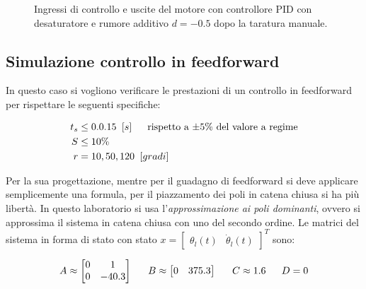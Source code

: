 		\begin{figure}[H]
			\centering
			 
			\caption{Ingressi di controllo e uscite del motore con controllore PID con desaturatore e rumore additivo $d=-0.5$ dopo la taratura manuale.}
			\label{fig:PIDd__0_5}		
		\end{figure}		
		
		
		
	
	
	
	
	
		
	\subsection{Simulazione controllo in feedforward}	
	\label{subsec:feedforwardSim}
	
		In questo caso si vogliono verificare le prestazioni di un controllo in feedforward per rispettare le seguenti specifiche:

		\begin{align*}
			t_s &\le 0.0.15 \singleSpacing [s] \trippleSpacing \textnormal{rispetto a $\pm 5 \%$ del valore a regime} \\
			S &\le 10  \% \\
			r &= 10,50,120 \singleSpacing [gradi] \\
		\end{align*}	
		
		\noindent Per la sua progettazione, mentre per il guadagno di feedforward si deve applicare semplicemente una formula, per il piazzamento dei poli in catena chiusa si ha più libertà. In questo laboratorio si usa l'\textit{approssimazione ai poli dominanti}, ovvero si approssima il sistema in catena chiusa con uno del secondo ordine. Le matrici del sistema in forma di stato con stato $x=\begin{bmatrix}\theta_l(t) & \dot{\theta}_l(t)\end{bmatrix}^T$ sono:
		
		\begin{align*}
			A\approx
			\begin{bmatrix}
				0 & 1     \\
				0 & -40.3 \\
			\end{bmatrix}
			\trippleSpacing
			B\approx
			\begin{bmatrix}
				0 & 375.3 \\
			\end{bmatrix}
			\trippleSpacing
			C\approx 1.6
			\trippleSpacing
			D=0
		\end{align*}
		
